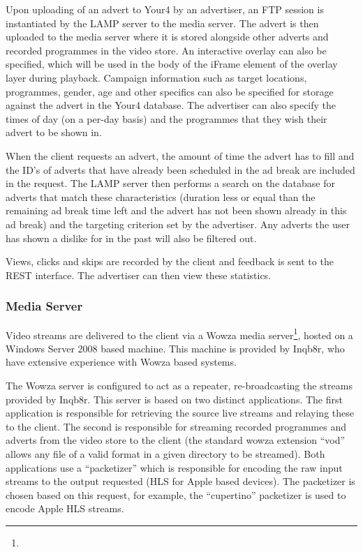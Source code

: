 Upon uploading of an advert to Your4 by an advertiser, an FTP session is instantiated by the LAMP server to the media server. The advert is then uploaded to the media server where it is stored alongside other adverts and recorded programmes in the video store. An interactive overlay can also be specified, which will be used in the body of the iFrame element of the overlay layer during playback. Campaign information such as target locations, programmes, gender, age and other specifics can also be specified for storage against the advert in the Your4 database. The advertiser can also specify the times of day (on a per-day basis) and the programmes that they wish their advert to be shown in.

When the client requests an advert, the amount of time the advert has to fill and the ID's of adverts that have already been scheduled in the ad break are included in the request. The LAMP server then performs a search on the database for adverts that match these characteristics (duration less or equal than the remaining ad break time left and the advert has not been shown already in this ad break) and the targeting criterion set by the advertiser. Any adverts the user has shown a dislike for in the past will also be filtered out.

Views, clicks and skips are recorded by the client and feedback is sent to the REST interface. The advertiser can then view these statistics.

\subsubsection{Media Server}

Video streams are delivered to the client via a Wowza media server\footnote{}, hosted on a Windows Server 2008 based machine. This machine is provided by Inqb8r, who have extensive experience with Wowza based systems.

The Wowza server is configured to act as a repeater, re-broadcasting the streams provided by Inqb8r. This server is based on two distinct applications. The first application is responsible for retrieving the source live streams and relaying these to the client. The second is responsible for streaming recorded programmes and adverts from the video store to the client (the standard wowza extension ``vod'' allows any file of a valid format in a given directory to be streamed). Both applications use a ``packetizer'' which is responsible for encoding the raw input streams to the output requested (HLS for Apple based devices). The packetizer is chosen based on this request, for example, the ``cupertino'' packetizer is used to encode Apple HLS streams.

